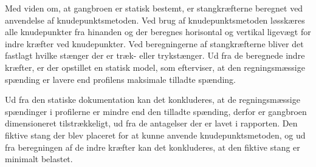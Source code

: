 Med viden om, at gangbroen er statisk bestemt, er stangkræfterne beregnet ved anvendelse af knudepunktsmetoden. Ved brug af knudepunktsmetoden løsskæres alle knudepunkter fra hinanden og der beregnes horisontal og vertikal ligevægt for indre kræfter ved knudepunkter.  Ved beregningerne af stangkræfterne bliver det fastlagt hvilke stænger der er træk- eller trykstænger. Ud fra de beregnede indre kræfter, er der opstillet en statisk model, som efterviser, at den regningsmæssige spænding er lavere end profilens maksimale tilladte spænding.  

Ud fra den statiske dokumentation kan det konkluderes, at de regningsmæssige spændinger i profilerne er mindre end den tilladte spænding, derfor er gangbroen dimensioneret tilstrækkeligt, ud fra de antagelser der er lavet i rapporten. Den fiktive stang der blev placeret for at kunne anvende knudepunktsmetoden, og ud fra beregningen af de indre kræfter kan det konkluderes, at den fiktive stang er minimalt belastet.  
